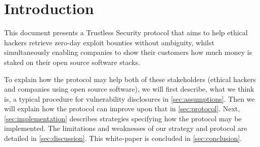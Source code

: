 \section{Introduction}
\label{sec:introduction}
This document presents a Trustless Security protocol that aims to help ethical hackers retrieve zero-day exploit bounties without ambiguity, whilst simultaneously enabling companies to show their customers how much money is staked on their open source software stacks.


To explain how the protocol may help both of these stakeholders (ethical hackers and companies using open source software), we will first describe, what we think is, a typical procedure for vulnerability disclosures in \cref{sec:assumptions}. Then we will explain how the protocol can improve upon that in \cref{sec:protocol}. Next, \cref{sec:implementation} describes strategies specifying how the protocol may be implemented. The limitations and weaknesses of our strategy and protocol are detailed in \cref{sec:discussion}. This white-paper is concluded in \cref{sec:conclusion}.